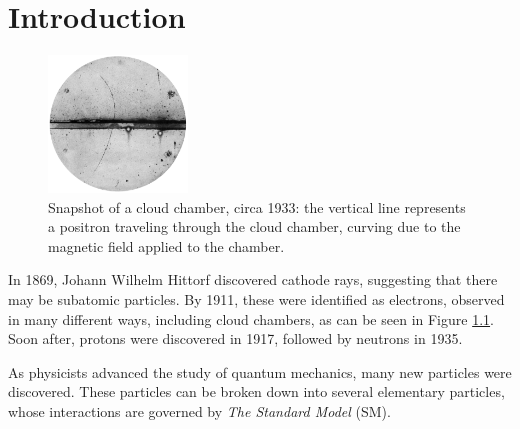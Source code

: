 \chapter{Introduction}\label{Sec:Intro}
\begin{figure}[h]
    \centering
        \includegraphics[width=0.33\textwidth]{F1/Cloud}
        \caption{Snapshot of a cloud chamber, circa 1933: the vertical line represents a positron traveling through the cloud chamber, curving due to the magnetic field applied to the chamber.}
        \label{Fig:Intro:Elec}
\end{figure}

In 1869, Johann Wilhelm Hittorf discovered cathode rays\cite{cathode}, suggesting that there may be subatomic particles. By 1911, these were identified as electrons, observed in many different ways, including cloud chambers, as can be seen in Figure \ref{Fig:Intro:Elec}. Soon after, protons were discovered in 1917, followed by neutrons in 1935.

As physicists advanced the study of quantum mechanics, many new particles were discovered. These particles can be broken down into several elementary particles, whose interactions are governed by \textit{The Standard Model} (SM).

